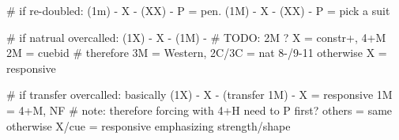 # if re-doubled:
(1m) - X - (XX) - P = pen.
(1M) - X - (XX) - P = pick a suit

# if natrual overcalled:
(1X) - X - (1M) -  # TODO: 2M ?
    X = constr+, 4+M
    2M = cuebid  # therefore 3M = Western, 2C/3C = nat 8-/9-11
otherwise X = responsive

# if transfer overcalled: basically
(1X) - X - (transfer 1M) - 
    X = responsive
    1M = 4+M, NF  # note: therefore forcing with 4+H need to P first?
    others = same
otherwise X/cue = responsive emphasizing strength/shape
